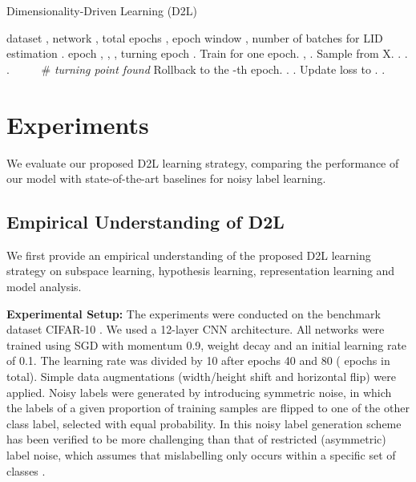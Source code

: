 \documentclass{article}
\begin{document}
\begin{algorithm}[tb]
   \caption{Dimensionality-Driven Learning (D2L)}
   \label{alg:manifold}
\begin{algorithmic}
    dataset , network , total epochs , epoch window , number of batches for LID estimation  .
   epoch , , , turning epoch .
  \REPEAT
\STATE Train  for one epoch.
   \STATE , .
   \STATE Sample  from X.
   \STATE .
   \ENDFOR
   \STATE .
   \STATE . ~~~~~\# \textit{turning point found}
   \STATE Rollback  to the -th epoch.
   \ENDIF
   \IF{}
   \STATE .
\ELSE
   \STATE 
  \ENDIF
   \STATE  .
   \STATE Update loss to .
   \STATE .
\end{algorithmic}
\end{algorithm}


\section{Experiments}\label{sec:experiments}
We evaluate our proposed D2L learning strategy, comparing the performance of our model with state-of-the-art baselines for noisy label learning.

\subsection{Empirical Understanding of D2L}
\label{sec:understanding}
We first provide an empirical understanding of the proposed D2L learning strategy on subspace learning, hypothesis learning, representation learning and model analysis.

\textbf{Experimental Setup:}
The experiments were conducted on the benchmark dataset CIFAR-10 \cite{krizhevsky2009learning}. We used a 12-layer CNN architecture.
All networks were trained using SGD with momentum 0.9, weight decay  and an initial learning rate of 0.1. The learning rate was divided by 10 after epochs 40 and 80 ( epochs in total). 
Simple data augmentations (width/height shift and horizontal flip) were applied. Noisy labels were generated by introducing symmetric noise, in which the labels of a given proportion of training samples are flipped to one of the other class label, selected with equal probability. In \cite{vahdat2017toward} this noisy label generation scheme has been verified to be more challenging than that of restricted (asymmetric) label noise, which assumes that mislabelling only occurs within a specific set of classes \cite{reed2014training,patrini2017making}. 
\end{document}
